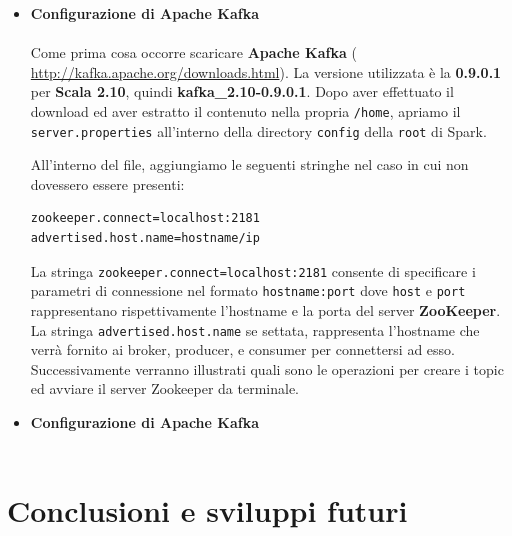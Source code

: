 \documentclass[12pt]{article}
\begin{document}
\begin{itemize}
\item {\textbf{Configurazione di Apache Kafka}}\\\\
Come prima cosa occorre scaricare \textbf{Apache Kafka} ( \href{http://kafka.apache.org/downloads.html}{http://kafka.apache.org/downloads.html}). La versione utilizzata è la \textbf{0.9.0.1} per \textbf{Scala 2.10}, quindi \textbf{kafka\_2.10-0.9.0.1}. Dopo aver effettuato il download ed aver estratto il contenuto nella propria \texttt{/home}, apriamo il \texttt{server.properties} all'interno della directory \texttt{config} della \texttt{root} di Spark.

All'interno del file, aggiungiamo le seguenti stringhe nel caso in cui non dovessero essere presenti: 
\begin{lstlisting}[language=bash,caption=server.properties]
zookeeper.connect=localhost:2181
advertised.host.name=hostname/ip
\end{lstlisting}
La stringa \texttt{zookeeper.connect=localhost:2181} consente di specificare i parametri di connessione nel formato \texttt{hostname:port} dove \texttt{host} e \texttt{port} rappresentano rispettivamente l'hostname e la porta del server \textbf{ZooKeeper}. La stringa \texttt{advertised.host.name} se settata, rappresenta l'hostname che verrà fornito ai broker, producer, e consumer per connettersi ad esso.
Successivamente verranno illustrati quali sono le operazioni per creare i topic ed avviare il server Zookeeper da terminale.

\item {\textbf{Configurazione di Apache Kafka}}\\\\
\end{itemize}


\section{Conclusioni e sviluppi futuri}

\clearpage
{}
\nocite{*}



\newpage
\end{document}
